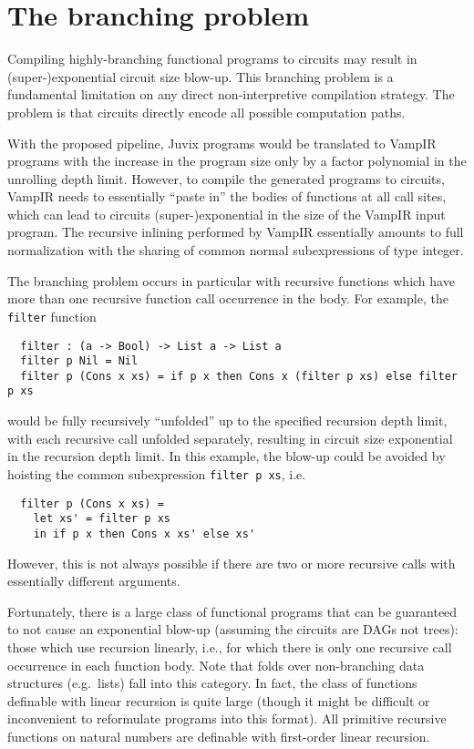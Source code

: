 \section{The branching problem}\label{sec_branching}

Compiling highly-branching functional programs to circuits may result
in (super-)exponential circuit size blow-up. This branching problem is
a fundamental limitation on any direct non-interpretive compilation
strategy. The problem is that circuits directly encode all possible
computation paths.

With the proposed pipeline, Juvix programs would be translated to
VampIR programs with the increase in the program size only by a factor
polynomial in the unrolling depth limit. However, to compile the
generated programs to circuits, VampIR needs to essentially ``paste
in'' the bodies of functions at all call sites, which can lead to
circuits (super-)exponential in the size of the VampIR input
program. The recursive inlining performed by VampIR essentially
amounts to full normalization with the sharing of common normal
subexpressions of type integer.

The branching problem occurs in particular with recursive functions
which have more than one recursive function call occurrence in the
body. For example, the \texttt{filter} function

\begin{verbatim}
  filter : (a -> Bool) -> List a -> List a
  filter p Nil = Nil
  filter p (Cons x xs) = if p x then Cons x (filter p xs) else filter p xs
\end{verbatim}
would be fully recursively ``unfolded'' up to the specified recursion
depth limit, with each recursive call unfolded separately, resulting
in circuit size exponential in the recursion depth limit. In this
example, the blow-up could be avoided by hoisting the common
subexpression \texttt{filter p xs}, i.e.
\begin{verbatim}
  filter p (Cons x xs) =
    let xs' = filter p xs
    in if p x then Cons x xs' else xs'
\end{verbatim}
However, this is not always possible if there are two or more
recursive calls with essentially different arguments.

Fortunately, there is a large class of functional programs that can be
guaranteed to not cause an exponential blow-up (assuming the circuits
are DAGs not trees): those which use recursion linearly, i.e., for
which there is only one recursive call occurrence in each function
body. Note that folds over non-branching data structures (e.g.~lists)
fall into this category. In fact, the class of functions definable
with linear recursion is quite large (though it might be difficult or
inconvenient to reformulate programs into this format). All primitive
recursive functions on natural numbers are definable with first-order
linear recursion.

